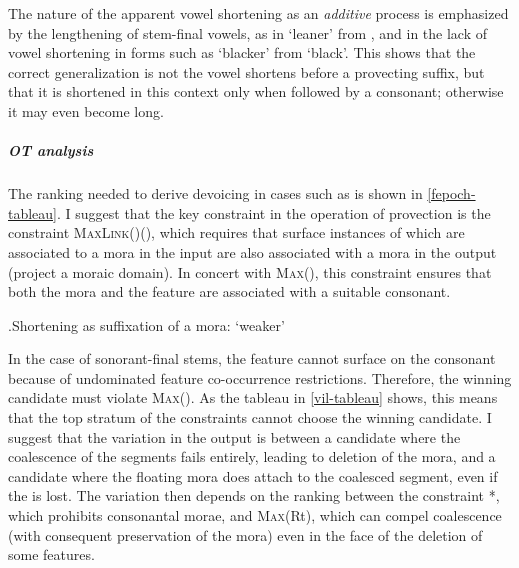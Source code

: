 The nature of the apparent vowel shortening as an \emph{additive} process is emphasized by the lengthening of stem-final vowels, as in \ipa{[kasˈtiːɒh]} `leaner' from \ipa{[ˈkasti]}, and in the lack of vowel shortening in forms such as \ipa{[ˈdyːɒh]} `blacker' from \ipa{[ˈdyː]} `black'. This shows that the correct generalization is not the vowel shortens before a provecting suffix, but that it is shortened in this context only when followed by a consonant; otherwise it may even become long.

\subparagraph{OT analysis}
\label{sec:ot-analysis-12}

The ranking needed to derive devoicing in cases such as \ipa{[ˈfæpɒh]} is shown in \ref{fepoch-tableau}. I suggest that the key constraint in the operation of provection is the constraint \textsc{MaxLink}()(\mo), which requires that surface instances of  which are associated to a mora in the input are also associated with a mora in the output (\ie project a moraic domain). In concert with \textsc{Max}(), this constraint ensures that both the mora and the feature are associated with a suitable consonant.

\ex.\label{fepoch-tableau}Shortening as suffixation of a mora: \ipa{[ˈfæpɒh]} `weaker'\\

In the case of sonorant\hyp final stems, the  feature cannot surface on the consonant because of undominated feature co\hyp occurrence restrictions. Therefore, the winning candidate must violate \textsc{Max}(). As the tableau in \ref{vil-tableau} shows, this means that the top stratum of the constraints cannot choose the winning candidate. I suggest that the variation in the output is between a candidate where the coalescence of the segments fails entirely, leading to deletion of the mora, and a candidate where the floating mora does attach to the coalesced segment, even if the  is lost. The variation then depends on the ranking between the constraint *\mo[C], which prohibits consonantal morae, and \textsc{Max}(Rt), which can compel coalescence (with consequent preservation of the mora) even in the face of the deletion of some features.

